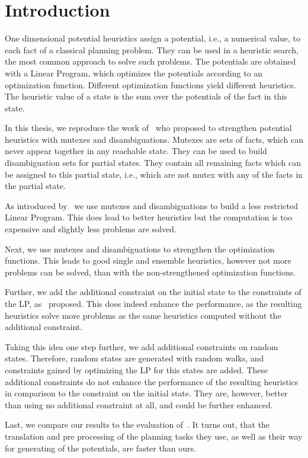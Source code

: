 \chapter{Introduction}\label{ch:introduction}

One dimensional potential heuristics assign a potential, i.e., a numerical value, to each fact of a classical planning problem.
They can be used in a heuristic search, the most common approach to solve such problems.
The potentials are obtained with a Linear Program, which optimizes the potentials according to an optimization function.
Different optimization functions yield different heuristics.
The heuristic value of a state is the sum over the potentials of the fact in this state.

In this thesis, we reproduce the work of~\cite{fivser2020strengthening} who proposed to strengthen potential heuristics with mutexes and disambiguations.
Mutexes are sets of facts, which can never appear together in any reachable state.
They can be used to build disambiguation sets for partial states.
They contain all remaining facts which can be assigned to this partial state, i.e., which are not mutex with any of the facts in the partial state.

As introduced by~\cite{fivser2020strengthening} we use mutexes and disambiguations to build a less restricted Linear Program.
This does lead to better heuristics but the computation is too expensive and slightly less problems are solved.

Next, we use mutexes and disambiguations to strengthen the optimization functions.
This leads to good single and ensemble heuristics, however not more problems can be solved, than with the non-strengthened optimization functions.

Further, we add the additional constraint on the initial state to the constraints of the LP, as~\cite{fivser2020strengthening} proposed.
This does indeed enhance the performance, as the resulting heuristics solve more problems as the same heuristics computed without the additional constraint.

Taking this idea one step further, we add additional constraints on random states.
Therefore, random states are generated with random walks, and constraints gained by optimizing the LP for this states are added.
These additional constraints do not enhance the performance of the resulting heuristics in comparison to the constraint on the initial state.
They are, however, better than using no additional constraint at all, and could be further enhanced.

Last, we compare our results to the evaluation of~\cite{fivser2020strengthening}.
It turns out, that the translation and pre processing of the planning tasks they use, as well as their way for generating of the potentials, are faster than ours.
